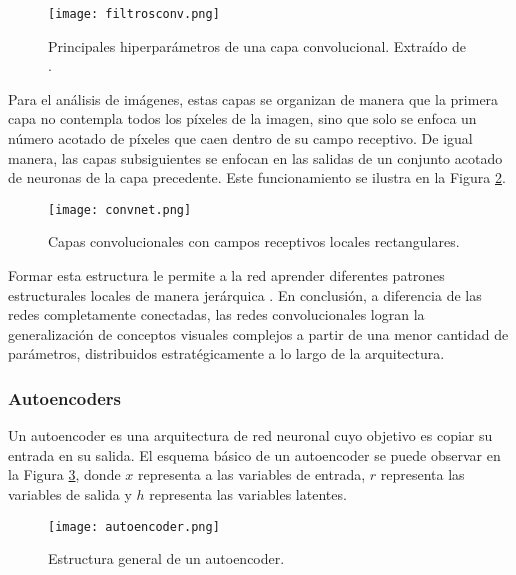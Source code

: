 \begin{figure}[H]
  \centering{}
  \texttt{[image: filtrosconv.png]}
  \caption{Principales hiperparámetros de una capa convolucional. Extraído de \cite{lagartija}.}
  \label{fig:variables_conv}
\end{figure}


Para el análisis de imágenes, estas capas se organizan de manera que la primera capa no contempla todos los píxeles de la imagen, sino que solo se enfoca un número acotado de píxeles que caen dentro de su campo receptivo. De igual manera, las capas subsiguientes se enfocan en las salidas de un conjunto acotado de neuronas de la capa precedente. Este funcionamiento se ilustra en la Figura \ref{fig:convnet}. 

\begin{figure}[H]
  \centering{}
  \texttt{[image: convnet.png]}
  \caption{Capas convolucionales con campos receptivos locales rectangulares.}
  \label{fig:convnet}
\end{figure}

Formar esta estructura le permite a la red aprender diferentes patrones estructurales locales de manera jerárquica \cite{lagartija}. En conclusión, a diferencia de las redes completamente conectadas, las redes convolucionales logran la generalización de conceptos visuales complejos a partir de una menor cantidad de parámetros, distribuidos estratégicamente a lo largo de la arquitectura.  

\subsubsection{Autoencoders}

Un autoencoder es una arquitectura de red neuronal cuyo objetivo es copiar su entrada en su salida. El esquema básico de un autoencoder se puede observar en la Figura \ref{fig:autoencoder}, donde $x$ representa a las variables de entrada, $r$ representa las variables de salida y $h$ representa las variables latentes. 

\begin{figure}[H]
	\centering{}
	\texttt{[image: autoencoder.png]}
	\caption{Estructura general de un autoencoder.}
	\label{fig:autoencoder}
\end{figure}

